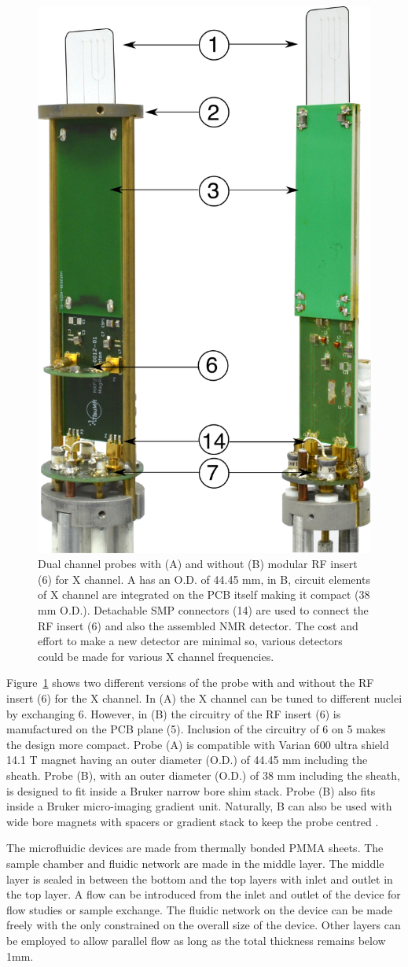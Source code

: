 \documentclass[preprint,12pt]{article}
\begin{document}
\begin{figure}
\centering
\includegraphics[width=.5\linewidth,keepaspectratio=true]{./figures/ms5n17-tlp-im-181007-both-detectors.png}
\caption{Dual channel probes with (A) and without (B) modular RF insert (6) for X channel. A has an O.D. of 44.45 mm, in B, circuit elements of X channel are integrated on the PCB itself making it compact (38 mm O.D.). Detachable SMP connectors (14) are used to connect the RF insert (6) and also the assembled NMR detector. The cost and effort to make a new detector are minimal so, various detectors could be made for various X channel frequencies.}
\label{fig:ProbePhoto}
\end{figure}
Figure~\ref{fig:ProbePhoto} shows two different versions of the probe with and without the RF insert (6) for the X channel. In (A) the X channel can be tuned to different nuclei by exchanging 6. However, in (B) the circuitry of the RF insert (6) is manufactured on the PCB plane (5). Inclusion of the circuitry of 6 on 5 makes the design more compact. Probe (A) is compatible with Varian 600 ultra shield 14.1 T magnet having an outer diameter (O.D.) of 44.45 mm including the sheath. Probe (B), with an outer diameter (O.D.) of 38 mm including the sheath, is designed to fit inside a Bruker narrow bore shim stack. Probe (B) also fits inside a Bruker micro-imaging gradient unit. Naturally, B can also be used with wide bore magnets with spacers or gradient stack to keep the probe centred .\par
The microfluidic devices are made from thermally bonded PMMA sheets. The sample chamber and fluidic network are made in the middle layer. The middle layer is sealed in between the bottom and the top layers with inlet and outlet in the top layer. A flow can be introduced from the inlet and outlet of the device for flow studies or sample exchange. The fluidic network on the device can be made freely with the only constrained on the overall size of the device. Other layers can be employed to allow parallel flow as long as the total thickness remains below 1mm.\par
\end{document}
